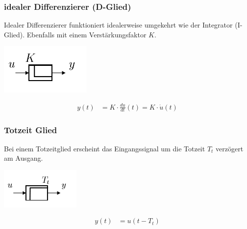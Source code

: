 \subsubsection{idealer Differenzierer (D-Glied)}
Idealer Differenzierer funktioniert idealerweise umgekehrt wie der Integrator (I-Glied). Ebenfalls mit einem Verstärkungsfaktor $K$.

\begin{center}
	\begin{minipage}{0.10\textwidth}
		\includegraphics[width=\linewidth,keepaspectratio=true]{Images/dglied}
	\end{minipage}%
	\begin{minipage}{0.3\textwidth}
		\begin{align*}
			y(t) &= K \cdot \frac{du}{dt}(t) = K\cdot \dot{u}(t)
		\end{align*}
	\end{minipage}
\end{center}


\subsubsection{Totzeit Glied}
Bei einem Totzeitglied erscheint das Eingangssignal um die Totzeit $T_t$ verzögert am Ausgang.

\begin{center}
	\begin{minipage}{0.10\textwidth}
		\includegraphics[width=\linewidth,keepaspectratio=true]{Images/totzeitglied}
	\end{minipage}%
	\begin{minipage}{0.3\textwidth}
		\begin{align*}
			y(t) &= u(t - T_t)
		\end{align*}
	\end{minipage}
\end{center}

